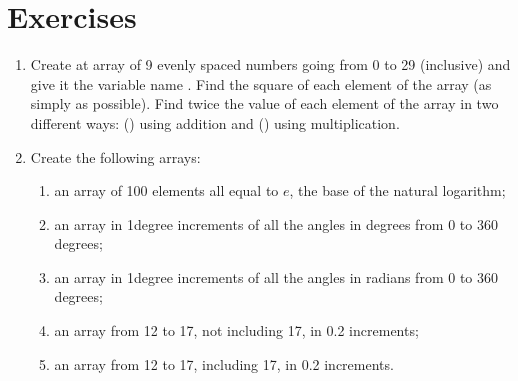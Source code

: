 \documentclass[letterpaper,10pt,english]{sphinxmanual}
\begin{document}
\newpage


\section{Exercises}
\label{\detokenize{chap3/chap3_arrays:exercises}}\begin{enumerate}
%
\item {} 
\sphinxAtStartPar
Create at array of 9 evenly spaced numbers going from 0 to 29 (inclusive) and give it the variable name .  Find the square of each element of the array (as simply as possible).  Find twice the value of each element of the array in two different ways: () using addition and () using multiplication.

\item {} 
\sphinxAtStartPar
Create the following arrays:
\begin{enumerate}
%
\item {} 
\sphinxAtStartPar
an array of 100 elements all equal to \(e\), the base of the natural logarithm;

\item {} 
\sphinxAtStartPar
an array in 1\sphinxhyphen{}degree increments of all the angles in degrees from 0 to 360 degrees;

\item {} 
\sphinxAtStartPar
an array in 1\sphinxhyphen{}degree increments of all the angles in radians from 0 to 360 degrees;

\item {} 
\sphinxAtStartPar
an array from 12 to 17, not including 17, in 0.2 increments;

\item {} 
\sphinxAtStartPar
an array from 12 to 17, including 17, in 0.2 increments.

\end{enumerate}


\end{enumerate}
\end{document}
